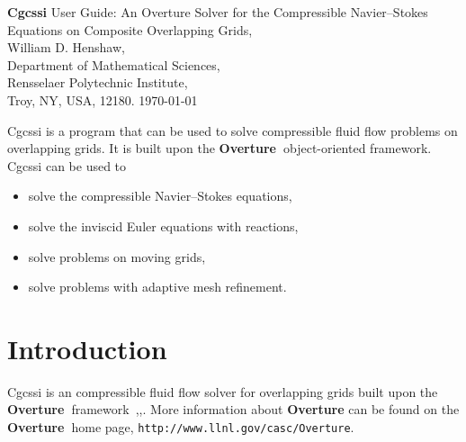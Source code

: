 \documentclass{article}
\newcommand{\Overture}{{\bf Overture\ }}
\begin{document}


\def\ud     {{    U}}
\def\pd     {{    P}}

\newcommand{\mbar}{\bar{m}}
\newcommand{\Rbar}{\bar{R}}
\newcommand{\Ru}{R_u}         %
\newcommand{\Div}{\grad\cdot}
\newcommand{\tauv}{\boldsymbol{\tau}}
\newcommand{\sumi}{\sum_{i=1}^n}
\newcommand{\dt}{{\Delta t}}

\baselineskip
\begin{flushleft}
{\Large
{\bf Cgcssi} User Guide: An Overture Solver for the Compressible Navier--Stokes Equations on Composite Overlapping Grids,\\
}
\vspace{2\baselineskip}
William D. Henshaw,\\
Department of Mathematical Sciences, \\
Rensselaer Polytechnic Institute, \\
Troy, NY, USA, 12180.
\vspace{\baselineskip}
\today\\

\vspace{4\baselineskip}


   Cgcssi is a program that can be used to solve compressible fluid flow problems on overlapping
grids. It is built upon the \Overture object-oriented framework. 
Cgcssi can be used to 
\begin{itemize}
  \item solve the compressible Navier--Stokes equations,
  \item solve the inviscid Euler equations with reactions, 
  \item solve problems on moving grids, 
  \item solve problems with adaptive mesh refinement.
\end{itemize} 

\end{flushleft}

\clearpage
\tableofcontents

\clearpage
\section{Introduction}

Cgcssi is an compressible fluid flow solver for overlapping grids built upon
the \Overture framework~\cite{Brown97},\cite{Henshaw96a},\cite{iscope97}.
More information about
{\bf Overture} can be found on the \Overture home page, {\tt http://www.llnl.gov/\-casc/\-Overture}.
\end{document}
